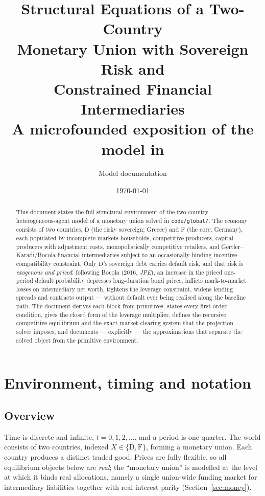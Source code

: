 \documentclass[11pt]{article}
\title{\vspace{-1.4cm}\bfseries Structural Equations of a Two-Country\\
Monetary Union with Sovereign Risk and\\ Constrained Financial Intermediaries\\[6pt]
\large A microfounded exposition of the model in \code{code/global/}}
\author{Model documentation}
\date{\today}
\numberwithin{equation}{section}
\newcommand{\code}[1]{\texttt{\small #1}}
\newcommand{\D}{\mathrm{D}}
\newcommand{\F}{\mathrm{F}}
\theoremstyle{definition}
\theoremstyle{plain}
\theoremstyle{remark}
\begin{document}
\maketitle

\begin{abstract}
\noindent This document states the full structural environment of the two-country
heterogeneous-agent model of a monetary union solved in \code{code/global/}. The
economy consists of two countries, $\D$ (the risky sovereign; Greece) and $\F$ (the
core; Germany), each populated by incomplete-markets households, competitive
producers, capital producers with adjustment costs, monopolistically competitive
retailers, and Gertler--Karadi/Bocola financial intermediaries subject to an
occasionally-binding incentive-compatibility constraint. Only $\D$'s sovereign
debt carries default risk, and that risk is \emph{exogenous and priced}: following
Bocola (2016, \emph{JPE}), an increase in the priced one-period default probability
depresses long-duration bond prices, inflicts mark-to-market losses on intermediary
net worth, tightens the leverage constraint, widens lending spreads and contracts
output --- without default ever being realised along the baseline path. The
document derives each block from primitives, states every first-order condition,
gives the closed form of the leverage multiplier, defines the recursive competitive
equilibrium and the exact market-clearing system that the projection solver imposes,
and documents --- explicitly --- the approximations that separate the solved object
from the primitive environment.
\end{abstract}

\tableofcontents

\section{Environment, timing and notation}

\subsection{Overview}

Time is discrete and infinite, $t=0,1,2,\dots$, and a period is one quarter. The
world consists of two countries, indexed $X\in\{\D,\F\}$, forming a monetary union.
Each country produces a distinct traded good. Prices are fully flexible, so all
equilibrium objects below are \emph{real}; the ``monetary union'' is modelled at the
level at which it binds real allocations, namely a single union-wide funding market
for intermediary liabilities together with real interest parity
(Section~\ref{sec:money}).
\end{document}
